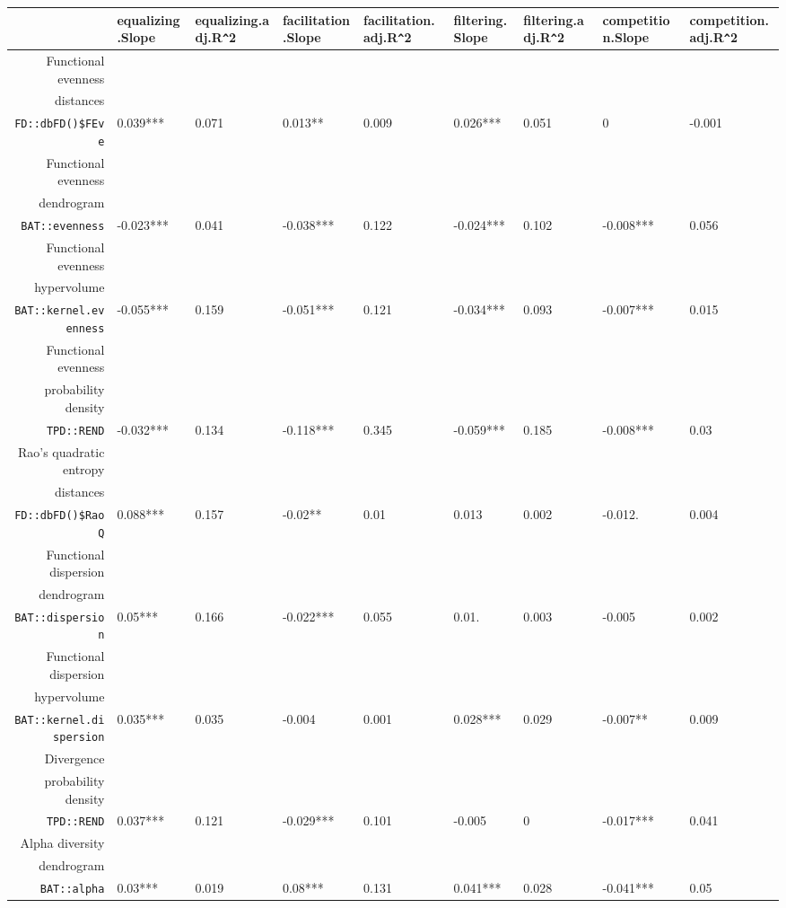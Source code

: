 \begin{table}[ht]
\scriptsize
\centering
\begin{tabular}{rllllllll}
  \hline
 & equalizing.Slope & equalizing.adj.R\verb|^|2 & facilitation.Slope & facilitation.adj.R\verb|^|2 & filtering.Slope & filtering.adj.R\verb|^|2 & competition.Slope & competition.adj.R\verb|^|2 \\ 
  \hline
Functional evenness\\distances\\\texttt{FD::dbFD()\$FEve} & 0.039*** & 0.071 & 0.013** & 0.009 & 0.026*** & 0.051 & 0 & -0.001 \\ 
  Functional evenness\\dendrogram\\\texttt{BAT::evenness} & -0.023*** & 0.041 & -0.038*** & 0.122 & -0.024*** & 0.102 & -0.008*** & 0.056 \\ 
  Functional evenness\\hypervolume\\\texttt{BAT::kernel.evenness} & -0.055*** & 0.159 & -0.051*** & 0.121 & -0.034*** & 0.093 & -0.007*** & 0.015 \\ 
  Functional evenness\\probability density\\\texttt{TPD::REND} & -0.032*** & 0.134 & -0.118*** & 0.345 & -0.059*** & 0.185 & -0.008*** & 0.03 \\ 
  Rao's quadratic entropy\\distances\\\texttt{FD::dbFD()\$RaoQ} & 0.088*** & 0.157 & -0.02** & 0.01 & 0.013 & 0.002 & -0.012. & 0.004 \\ 
  Functional dispersion\\dendrogram\\\texttt{BAT::dispersion} & 0.05*** & 0.166 & -0.022*** & 0.055 & 0.01. & 0.003 & -0.005 & 0.002 \\ 
  Functional dispersion\\hypervolume\\\texttt{BAT::kernel.dispersion} & 0.035*** & 0.035 & -0.004 & 0.001 & 0.028*** & 0.029 & -0.007** & 0.009 \\ 
  Divergence\\probability density\\\texttt{TPD::REND} & 0.037*** & 0.121 & -0.029*** & 0.101 & -0.005 & 0 & -0.017*** & 0.041 \\ 
  Alpha diversity\\dendrogram\\\texttt{BAT::alpha} & 0.03*** & 0.019 & 0.08*** & 0.131 & 0.041*** & 0.028 & -0.041*** & 0.05 \\ 

\end{tabular}
\end{table}
